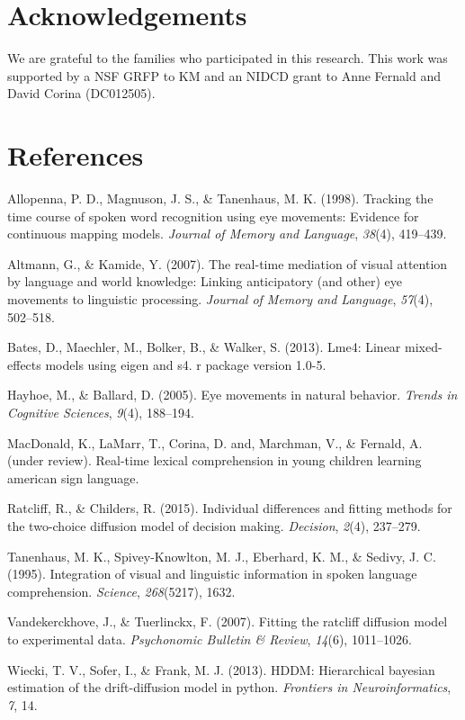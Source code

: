 \documentclass[10pt, letterpaper]{article}
\begin{document}
\section{Acknowledgements}\label{acknowledgements}

We are grateful to the families who participated in this research. This
work was supported by a NSF GRFP to KM and an NIDCD grant to Anne
Fernald and David Corina (DC012505).

\section{References}\label{references}

\setlength{\parindent}{-0.1in} \setlength{\leftskip}{0.125in} \noindent

\hypertarget{refs}{}
\hypertarget{ref-allopenna1998tracking}{}
Allopenna, P. D., Magnuson, J. S., \& Tanenhaus, M. K. (1998). Tracking
the time course of spoken word recognition using eye movements: Evidence
for continuous mapping models. \emph{Journal of Memory and Language},
\emph{38}(4), 419--439.

\hypertarget{ref-altmann2007real}{}
Altmann, G., \& Kamide, Y. (2007). The real-time mediation of visual
attention by language and world knowledge: Linking anticipatory (and
other) eye movements to linguistic processing. \emph{Journal of Memory
and Language}, \emph{57}(4), 502--518.

\hypertarget{ref-bates2013lme4}{}
Bates, D., Maechler, M., Bolker, B., \& Walker, S. (2013). Lme4: Linear
mixed-effects models using eigen and s4. r package version 1.0-5.

\hypertarget{ref-hayhoe2005eye}{}
Hayhoe, M., \& Ballard, D. (2005). Eye movements in natural behavior.
\emph{Trends in Cognitive Sciences}, \emph{9}(4), 188--194.

\hypertarget{ref-macdonald2017realtime}{}
MacDonald, K., LaMarr, T., Corina, D. and, Marchman, V., \& Fernald, A.
(under review). Real-time lexical comprehension in young children
learning american sign language.

\hypertarget{ref-ratcliff2015individual}{}
Ratcliff, R., \& Childers, R. (2015). Individual differences and fitting
methods for the two-choice diffusion model of decision making.
\emph{Decision}, \emph{2}(4), 237--279.

\hypertarget{ref-tanenhaus1995integration}{}
Tanenhaus, M. K., Spivey-Knowlton, M. J., Eberhard, K. M., \& Sedivy, J.
C. (1995). Integration of visual and linguistic information in spoken
language comprehension. \emph{Science}, \emph{268}(5217), 1632.

\hypertarget{ref-vandekerckhove2007fitting}{}
Vandekerckhove, J., \& Tuerlinckx, F. (2007). Fitting the ratcliff
diffusion model to experimental data. \emph{Psychonomic Bulletin \&
Review}, \emph{14}(6), 1011--1026.

\hypertarget{ref-wiecki2013hddm}{}
Wiecki, T. V., Sofer, I., \& Frank, M. J. (2013). HDDM: Hierarchical
bayesian estimation of the drift-diffusion model in python.
\emph{Frontiers in Neuroinformatics}, \emph{7}, 14.
\end{document}
